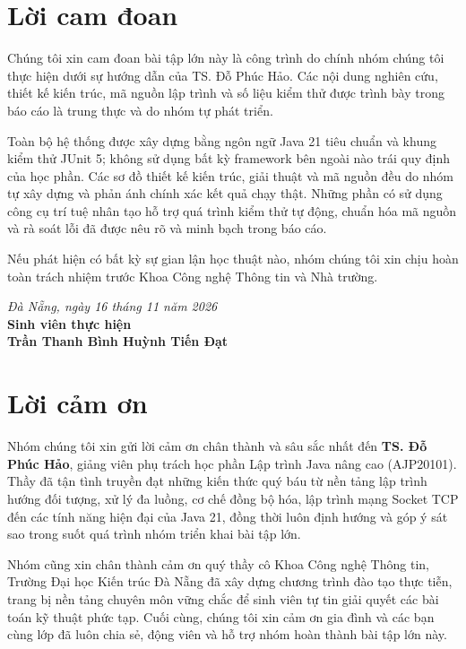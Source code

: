 \documentclass[12pt,a4paper,oneside]{report}
\begin{document}
\chapter*{Lời cam đoan}
Chúng tôi xin cam đoan bài tập lớn này là công trình do chính nhóm chúng tôi thực hiện dưới sự hướng dẫn của TS. Đỗ Phúc Hảo. Các nội dung nghiên cứu, thiết kế kiến trúc, mã nguồn lập trình và số liệu kiểm thử được trình bày trong báo cáo là trung thực và do nhóm tự phát triển.

Toàn bộ hệ thống được xây dựng bằng ngôn ngữ Java 21 tiêu chuẩn và khung kiểm thử JUnit 5; không sử dụng bất kỳ framework bên ngoài nào trái quy định của học phần. Các sơ đồ thiết kế kiến trúc, giải thuật và mã nguồn đều do nhóm tự xây dựng và phản ánh chính xác kết quả chạy thật. Những phần có sử dụng công cụ trí tuệ nhân tạo hỗ trợ quá trình kiểm thử tự động, chuẩn hóa mã nguồn và rà soát lỗi đã được nêu rõ và minh bạch trong báo cáo.

Nếu phát hiện có bất kỳ sự gian lận học thuật nào, nhóm chúng tôi xin chịu hoàn toàn trách nhiệm trước Khoa Công nghệ Thông tin và Nhà trường.

\begin{flushright}
  \textit{Đà Nẵng, ngày 16 tháng 11 năm 2026}\\[5mm]
  \textbf{Sinh viên thực hiện}\\[15mm]
  \textbf{Trần Thanh Bình \qquad Huỳnh Tiến Đạt}
\end{flushright}

\chapter*{Lời cảm ơn}
Nhóm chúng tôi xin gửi lời cảm ơn chân thành và sâu sắc nhất đến \textbf{TS. Đỗ Phúc Hảo}, giảng viên phụ trách học phần Lập trình Java nâng cao (AJP20101). Thầy đã tận tình truyền đạt những kiến thức quý báu từ nền tảng lập trình hướng đối tượng, xử lý đa luồng, cơ chế đồng bộ hóa, lập trình mạng Socket TCP đến các tính năng hiện đại của Java 21, đồng thời luôn định hướng và góp ý sát sao trong suốt quá trình nhóm triển khai bài tập lớn.

Nhóm cũng xin chân thành cảm ơn quý thầy cô Khoa Công nghệ Thông tin, Trường Đại học Kiến trúc Đà Nẵng đã xây dựng chương trình đào tạo thực tiễn, trang bị nền tảng chuyên môn vững chắc để sinh viên tự tin giải quyết các bài toán kỹ thuật phức tạp. Cuối cùng, chúng tôi xin cảm ơn gia đình và các bạn cùng lớp đã luôn chia sẻ, động viên và hỗ trợ nhóm hoàn thành bài tập lớn này.
\end{document}
